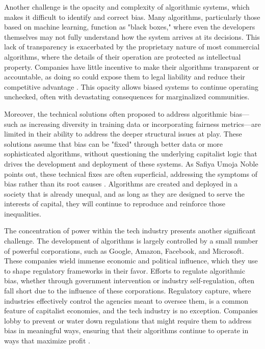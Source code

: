 Another challenge is the opacity and complexity of algorithmic systems, which makes it difficult to identify and correct bias. Many algorithms, particularly those based on machine learning, function as "black boxes," where even the developers themselves may not fully understand how the system arrives at its decisions. This lack of transparency is exacerbated by the proprietary nature of most commercial algorithms, where the details of their operation are protected as intellectual property. Companies have little incentive to make their algorithms transparent or accountable, as doing so could expose them to legal liability and reduce their competitive advantage \cite[pp.~105-108]{pasquale2015}. This opacity allows biased systems to continue operating unchecked, often with devastating consequences for marginalized communities.

Moreover, the technical solutions often proposed to address algorithmic bias—such as increasing diversity in training data or incorporating fairness metrics—are limited in their ability to address the deeper structural issues at play. These solutions assume that bias can be "fixed" through better data or more sophisticated algorithms, without questioning the underlying capitalist logic that drives the development and deployment of these systems. As Safiya Umoja Noble points out, these technical fixes are often superficial, addressing the symptoms of bias rather than its root causes \cite[pp.~145-147]{noble2019}. Algorithms are created and deployed in a society that is already unequal, and as long as they are designed to serve the interests of capital, they will continue to reproduce and reinforce those inequalities.

The concentration of power within the tech industry presents another significant challenge. The development of algorithms is largely controlled by a small number of powerful corporations, such as Google, Amazon, Facebook, and Microsoft. These companies wield immense economic and political influence, which they use to shape regulatory frameworks in their favor. Efforts to regulate algorithmic bias, whether through government intervention or industry self-regulation, often fall short due to the influence of these corporations. Regulatory capture, where industries effectively control the agencies meant to oversee them, is a common feature of capitalist economies, and the tech industry is no exception. Companies lobby to prevent or water down regulations that might require them to address bias in meaningful ways, ensuring that their algorithms continue to operate in ways that maximize profit \cite[pp.~210-213]{birhane2021}.

